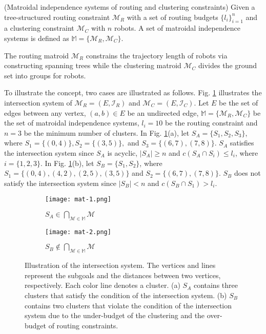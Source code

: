 \begin{definition}
    (Matroidal independence systems of routing and clustering constraints) Given a tree-structured routing constraint $\mathcal{M}_R$ with a set of routing budgets $\{l_i\}_{i=1}^n$ and a clustering constraint $\mathcal{M}_C$ with $n$ robots. A set of matroidal independence systems is defined as $\mathit{\mathbb{M}} = \{\mathcal{M}_R , \mathcal{M}_C\}$.\\
\end{definition}

The routing matroid $\mathcal{M}_R$ constrains the trajectory length of robots via constructing spanning trees while the clustering matroid $\mathcal{M}_C$ divides the ground set into groups for robots.

To illustrate the concept, two cases are illustrated as follows.
Fig. \ref{independent-set} illustrates the intersection system of $\mathcal{M}_R=(E, \mathcal{I}_R)$ and $\mathcal{M}_C=(E, \mathcal{I}_C)$.
Let $E$ be the set of edges between any vertex, $(a,b)\in E$ be an undirected edge, $\mathit{\mathbb{M}}=\{\mathcal{M}_R, \mathcal{M}_C\}$ be the set of matroidal independence systems, $l_i=10$ be the routing constraint and $n=3$ be the minimum number of clusters. In Fig. \ref{independent-set}(a), let $S_A=\{S_1,S_2,S_3\}$, where $S_1=\{(0,4)\},S_2=\{(3,5)\},$ and $S_3=\{(6,7),$$(7,8)\}$. $S_A$ satisfies the intersection system since $S_A$ is acyclic, $|S_A|\geq n$ and $c(S_A \cap S_i) \leq l_i$, where $i=\{1,2,3\}$.
In Fig. \ref{independent-set}(b), let $S_B=\{S_1,S_2\}$, where $S_1=\{(0,4),(4,2),(2,5),(3,5)\}$ and $S_2=\{(6,7),$$(7,8)\}$. $S_B$ does not satisfy the intersection system since $|S_B| < n$ and $c(S_B \cap S_1) > l_i$. \\

\begin{figure}
    \centering
    \begin{subfigure}[b]{0.4\textwidth}
        \texttt{[image: mat-1.png]}
        \caption{$S_A \in \bigcap_{\mathcal{M}\in \mathit{\mathbb{M}}} \mathcal{M}$}
    \end{subfigure}
    \hfill
    \quad
    \begin{subfigure}[b]{0.4\textwidth}
    \centering
        \texttt{[image: mat-2.png]}
        \caption{$S_B \not \in \bigcap_{\mathcal{M}\in \mathit{\mathbb{M}}} \mathcal{M}$}
    \end{subfigure}

    \caption{Illustration of the intersection system.
    The vertices and lines represent the subgoals and the distances between two vertices, respectively.
    Each color line denotes a cluster. (a) $S_A$ contains three clusters that satisfy the condition of the intersection system. (b) $S_B$ contains two clusters that violate the condition of the intersection system due to the under-budget of the clustering and the over-budget of routing constraints.
    }
    \label{independent-set}
\end{figure}

